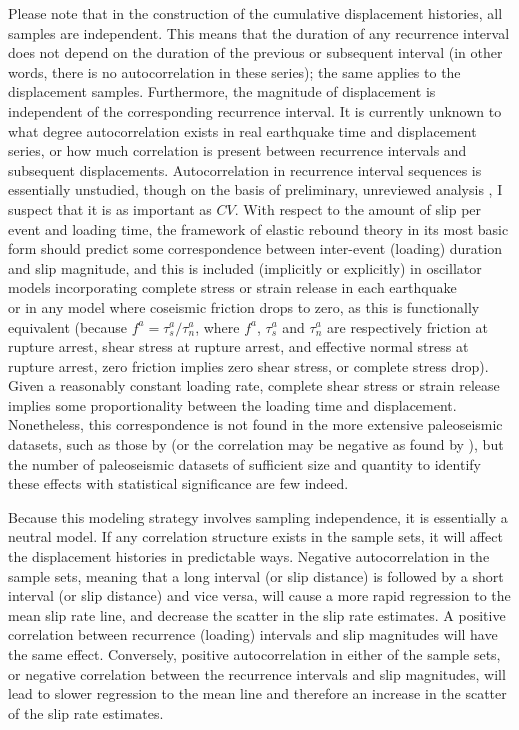 \documentclass[se, manuscript]{copernicus}
\begin{document}
Please note that in the construction of the cumulative displacement
histories, all samples are independent. This means that the duration of
any recurrence interval does not depend on the duration of the previous
or subsequent interval (in other words, there is no autocorrelation in
these series); the same applies to the displacement samples.
Furthermore, the magnitude of displacement is independent of the
corresponding recurrence interval. It is currently unknown to what
degree autocorrelation exists in real earthquake time and displacement
series, or how much correlation is present between recurrence intervals
and subsequent displacements. Autocorrelation in recurrence interval sequences 
is essentially unstudied,
though on the basis of preliminary, unreviewed analysis
\citep{styron_survival_2017}, I suspect that it is as important as
\(CV\). With respect to the amount of slip per event and loading time, the 
framework of elastic rebound
theory in its most basic form should predict some correspondence between
inter-event (loading) duration and slip magnitude, and this is included
(implicitly or explicitly) in oscillator models incorporating complete
stress or strain release in each earthquake\\
\citep[e.g.,][]{matthews_brownian_2002,dicaprio_post-seismic_2008} or in
any model where coseismic friction drops to zero, as this is
functionally equivalent (because \(f^a = \tau^a_s / \tau^a_n\), where
\(f^a\), \(\tau^a_s\) and \(\tau^a_n\) are respectively friction at
rupture arrest, shear stress at rupture arrest, and effective normal
stress at rupture arrest, zero friction implies zero shear stress, or
complete stress drop). Given a reasonably constant loading rate,
complete shear stress or strain release implies some proportionality
between the loading time and displacement. Nonetheless, this
correspondence is not found in the more extensive paleoseismic datasets,
such as those by \citet{benedetti_earthquake_2013} (or the correlation
may be negative as found by \citet{weldon_wrightwood_2004}), but the
number of paleoseismic datasets of sufficient size and quantity to
identify these effects with statistical significance are few indeed.

Because this modeling strategy involves sampling independence, it is
essentially a neutral model. If any correlation structure exists in the
sample sets, it will affect the displacement histories in predictable
ways. Negative autocorrelation in the sample sets, meaning that a long
interval (or slip distance) is followed by a short interval (or slip
distance) and vice versa, will cause a more rapid regression to the mean
slip rate line, and decrease the scatter in the slip rate estimates. A
positive correlation between recurrence (loading) intervals and slip
magnitudes will have the same effect. Conversely, positive
autocorrelation in either of the sample sets, or negative correlation
between the recurrence intervals and slip magnitudes, will lead to
slower regression to the mean line and therefore an increase in the
scatter of the slip rate estimates.
\end{document}
